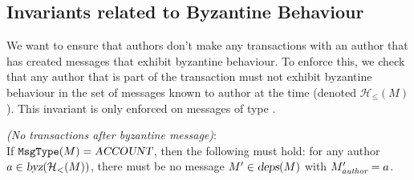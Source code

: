 
\subsection{Invariants related to Byzantine Behaviour}
\label{sec:invariants-byz}
We want to ensure that authors don't make any transactions with an author that has created messages that exhibit byzantine behaviour. To enforce this, we check that any author that is part of the transaction must not exhibit byzantine behaviour in the set of messages known to author at the time (denoted $\mathcal H_\leq(M)$). This invariant is only enforced on messages of type .
\begin{invariant}{}
    \emph{(No transactions after byzantine message)}:\\
    If $\texttt{MsgType}(M) = \textsl{ACCOUNT}$, then the following must hold: for any author $a \in \textsl{byz}(\mathcal H_<(M))$, there must be no message $M' \in \textsl{deps}(M)$ with $M'_\emph{author} = a$.
\end{invariant}


